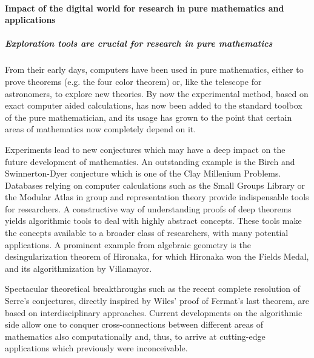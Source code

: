\paragraph{Impact of the digital world for research in pure mathematics and applications}

\subparagraph{Exploration tools are crucial for research in pure mathematics}

From their early days, computers have been used in pure mathematics,
either to prove theorems (e.g. the four color theorem) or, like the
telescope for astronomers, to explore new theories. By now the
experimental method, based on exact computer aided calculations, has
now been added to the standard toolbox of the pure mathematician, and
its usage has grown to the point that certain areas of mathematics now
completely depend on it.

Experiments lead to new conjectures which may have a deep impact on
the future development of mathematics. An outstanding example is the
Birch and Swinnerton-Dyer conjecture which is one of the Clay
Millenium Problems.  Databases relying on computer calculations such
as the Small Groups Library or the Modular Atlas in group and
representation theory provide indispensable tools for researchers. A
constructive way of understanding proofs of deep theorems yields
algorithmic tools to deal with highly abstract concepts. These tools
make the concepts available to a broader class of researchers, with
many potential applications. A prominent example from algebraic
geometry is the desingularization theorem of Hironaka, for which
Hironaka won the Fields Medal, and its algorithmization by Villamayor.

Spectacular theoretical breakthroughs such as the recent complete
resolution of Serre's conjectures, directly inspired by Wiles' proof
of Fermat's last theorem, are based on interdisciplinary approaches.
Current developments on the algorithmic side allow one to conquer
cross-connections between different areas of mathematics also
computationally and, thus, to arrive at cutting-edge applications
which previously were inconceivable.


